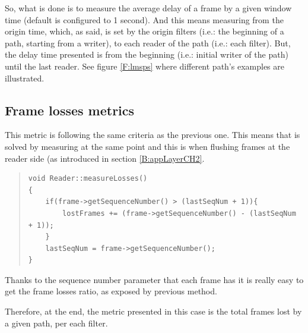So, what is done is to measure the average delay of a frame by a given window time (default is configured to 1 second). And this means measuring from the origin time, which, as said, is set by the origin filters (i.e.: the beginning of a path, starting from a writer), to each reader of the path (i.e.: each filter). But, the delay time presented is from the beginning (i.e.: initial writer of the path) until the last reader. See figure \ref{F:lmsps} where different path's examples are illustrated.

\subsection{Frame losses metrics}

This metric is following the same criteria as the previous one. This means that is solved by measuring at the same point and this is when flushing frames at the reader side (as introduced in section \ref{B:appLayerCH2}.

\begin{quote}
\begin{verbatim}
void Reader::measureLosses()
{
    if(frame->getSequenceNumber() > (lastSeqNum + 1)){
        lostFrames += (frame->getSequenceNumber() - (lastSeqNum + 1));
    }
    lastSeqNum = frame->getSequenceNumber();
}
\end{verbatim}
\end{quote} 

Thanks to the sequence number parameter that each frame has it is really easy to get the frame losses ratio, as exposed by previous method.

Therefore, at the end, the metric presented in this case is the total frames lost by a given path, per each filter.